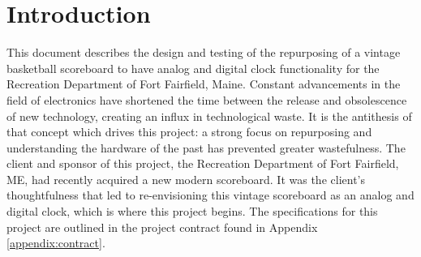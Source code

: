 \documentclass[11pt]{article}
\begin{document}
\newpage
\tableofcontents


\newpage
\listoffigures
\listoftables


\newpage 
{} %



\section{Introduction}

This document describes the design and testing of the repurposing of a vintage basketball scoreboard to have analog and digital clock functionality for the Recreation Department of Fort Fairfield, Maine.
Constant advancements in the field of electronics have shortened the time between the release and obsolescence of new technology, creating an influx in technological waste. 
It is the antithesis of that concept which drives this project: a strong focus on repurposing and understanding the hardware of the past has prevented greater wastefulness.
The client and sponsor of this project, the Recreation Department of Fort Fairfield, ME, had recently acquired a new modern scoreboard. 
It was the client's thoughtfulness that led to re-envisioning this vintage scoreboard as an analog and digital clock, which is where this project begins.
The specifications for this project are outlined in the project contract found in Appendix \ref{appendix:contract}. 
\end{document}
